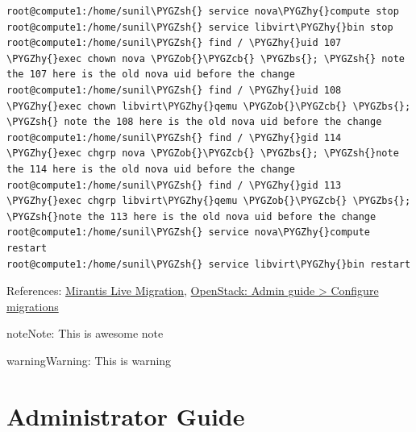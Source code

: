 \documentclass[letterpaper,10pt,english]{sphinxmanual}
\def\PYGZbs{\char`\\}
\def\PYGZob{\char`\{}
\def\PYGZcb{\char`\}}
\def\PYGZsh{\char`\#}
\def\PYGZhy{\char`\-}
\begin{document}
\begin{Verbatim}[commandchars=\\\{\}]
root@compute1:/home/sunil\PYGZsh{} service nova\PYGZhy{}compute stop
root@compute1:/home/sunil\PYGZsh{} service libvirt\PYGZhy{}bin stop
root@compute1:/home/sunil\PYGZsh{} find / \PYGZhy{}uid 107 \PYGZhy{}exec chown nova \PYGZob{}\PYGZcb{} \PYGZbs{}; \PYGZsh{} note the 107 here is the old nova uid before the change
root@compute1:/home/sunil\PYGZsh{} find / \PYGZhy{}uid 108 \PYGZhy{}exec chown libvirt\PYGZhy{}qemu \PYGZob{}\PYGZcb{} \PYGZbs{}; \PYGZsh{} note the 108 here is the old nova uid before the change
root@compute1:/home/sunil\PYGZsh{} find / \PYGZhy{}gid 114 \PYGZhy{}exec chgrp nova \PYGZob{}\PYGZcb{} \PYGZbs{}; \PYGZsh{}note the 114 here is the old nova uid before the change
root@compute1:/home/sunil\PYGZsh{} find / \PYGZhy{}gid 113 \PYGZhy{}exec chgrp libvirt\PYGZhy{}qemu \PYGZob{}\PYGZcb{} \PYGZbs{}; \PYGZsh{}note the 113 here is the old nova uid before the change
root@compute1:/home/sunil\PYGZsh{} service nova\PYGZhy{}compute restart
root@compute1:/home/sunil\PYGZsh{} service libvirt\PYGZhy{}bin restart
\end{Verbatim}

References:
\href{https://www.mirantis.com/blog/tutorial-openstack-live-migration-with-kvm-hypervisor-and-nfs-shared-storage/}{Mirantis Live Migration}, \href{http://docs.openstack.org/admin-guide/compute-configuring-migrations.html}{OpenStack: Admin guide \textgreater{} Configure migrations}

\begin{notice}{note}{Note:}
This is awesome note
\end{notice}

\begin{notice}{warning}{Warning:}
This is warning
\end{notice}


\chapter{Administrator Guide}
\label{_source/admin_guide:administrator-guide}\label{_source/admin_guide::doc}
\end{document}

